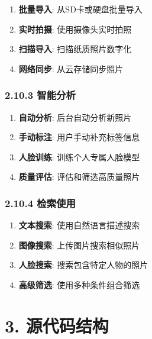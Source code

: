 \begin{enumerate}
\def\labelenumi{\arabic{enumi}.}
\tightlist
\item
  \textbf{批量导入}: 从SD卡或硬盘批量导入
\item
  \textbf{实时拍摄}: 使用摄像头实时拍照
\item
  \textbf{扫描导入}: 扫描纸质照片数字化
\item
  \textbf{网络同步}: 从云存储同步照片
\end{enumerate}

\subsubsection{2.10.3 智能分析}\label{ux667aux80fdux5206ux6790}

\begin{enumerate}
\def\labelenumi{\arabic{enumi}.}
\tightlist
\item
  \textbf{自动分析}: 后台自动分析新照片
\item
  \textbf{手动标注}: 用户手动补充标签信息
\item
  \textbf{人脸训练}: 训练个人专属人脸模型
\item
  \textbf{质量评估}: 评估和筛选高质量照片
\end{enumerate}

\subsubsection{2.10.4 检索使用}\label{ux68c0ux7d22ux4f7fux7528}

\begin{enumerate}
\def\labelenumi{\arabic{enumi}.}
\tightlist
\item
  \textbf{文本搜索}: 使用自然语言描述搜索
\item
  \textbf{图像搜索}: 上传图片搜索相似照片
\item
  \textbf{人脸搜索}: 搜索包含特定人物的照片
\item
  \textbf{高级筛选}: 使用多种条件组合筛选
\end{enumerate}

\section{3. 源代码结构}\label{ux6e90ux4ee3ux7801ux7ed3ux6784}

